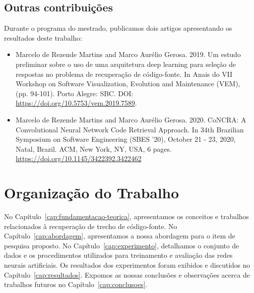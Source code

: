 \subsection{Outras contribuições}

Durante o programa do mestrado, publicamos dois artigos apresentando os resultados deste trabalho:

\begin{itemize}
    \item Marcelo de Rezende Martins and Marco Aurélio Gerosa. 2019. Um estudo preliminar sobre o uso de uma arquitetura deep learning para seleção de respostas no problema de recuperação de código-fonte. In Anais do VII Workshop on Software Visualization, Evolution and Maintenance (VEM), (pp. 94-101). Porto Alegre: SBC. DOI: \url{https://doi.org/10.5753/vem.2019.7589}.
    \item Marcelo de Rezende Martins and Marco Aurélio Gerosa. 2020. CoNCRA: A Convolutional Neural Network Code Retrieval Approach. In 34th Brazilian Symposium on Software Engineering (SBES ’20), October 21 - 23, 2020, Natal, Brazil. ACM, New York, NY, USA, 6 pages. \url{https://doi.org/10.1145/3422392.3422462}
\end{itemize}


\section{Organização do Trabalho}
\label{sec:organizacao_trabalho}

No Capítulo~\ref{cap:fundamentacao-teorica}, apresentamos os conceitos e trabalhos relacionados à recuperação de trecho de código-fonte. No Capítulo~\ref{cap:abordagem}, apresentamos a nossa abordagem para o item de pesquisa proposto. No Capítulo~\ref{cap:experimento}, detalhamos o conjunto de dados e os procedimentos utilizados para treinamento e avaliação das redes neurais artificiais. Os resultados dos experimentos foram exibidos e discutidos no Capítulo~\ref{cap:resultados}. Expomos as nossas conclusões e observações acerca de trabalhos futuros no Capítulo~\ref{cap:conclusoes}.